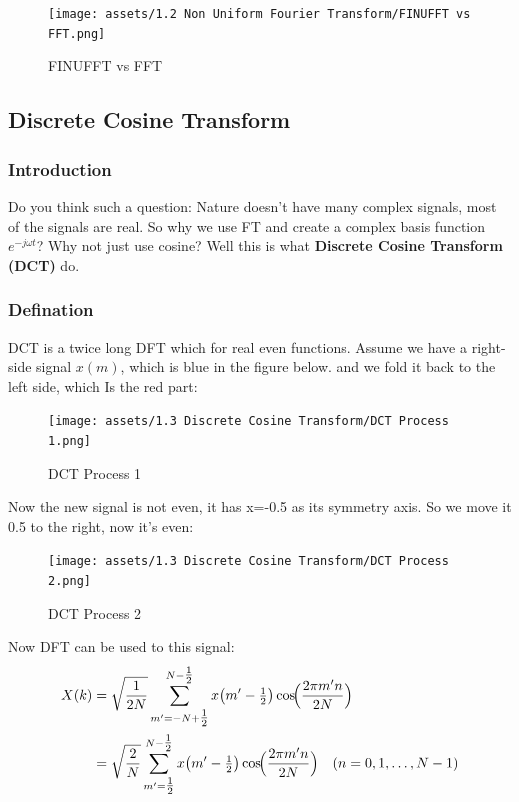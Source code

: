 \documentclass[12pt]{ctexart}
\begin{document}
\begin{figure}[H]
  \centering
  \texttt{[image: assets/1.2 Non Uniform Fourier Transform/FINUFFT
  vs FFT.png]}
  \caption{FINUFFT vs FFT}
\end{figure}

\subsection{\textbf{Discrete Cosine Transform}}

\subsubsection{\textbf{Introduction}}

Do you think such a question: Nature doesn't have many complex signals, most of the signals
are real. So why we use FT and create a complex basis function $e^{-j\omega t}$? Why not
just use cosine? Well this is what \textbf{Discrete Cosine Transform (DCT)} do.

\subsubsection{\textbf{Defination}}

DCT is a twice long DFT which for real even functions. Assume we have a right-side signal
$x(m)$, which is blue in the figure below. and we fold it back to the left side, which Is
the red part:

\begin{figure}[H]
  \centering
  \texttt{[image: assets/1.3 Discrete Cosine Transform/DCT
  Process 1.png]}
  \caption{DCT Process 1}
\end{figure}

Now the new signal is not even, it has x=-0.5 as its symmetry axis. So we move it 0.5 to
the right, now it's even:

\begin{figure}[H]
  \centering
  \texttt{[image: assets/1.3 Discrete Cosine Transform/DCT
  Process 2.png]}
  \caption{DCT Process 2}
\end{figure}

Now DFT can be used to this signal:
\begin{align}
X(k) &= \sqrt{\frac{1}{2N}}\sum_{m'=-N+\tfrac12}^{N-\tfrac12} x\bigl(m'-\tfrac12\bigr)
        \cos\!\Bigl(\frac{2\pi m'n}{2N}\Bigr)\\
     &= \sqrt{\frac{2}{N}}\sum_{m'=\tfrac12}^{N-\tfrac12}x\bigl(m'-\tfrac12\bigr)
        \cos\!\Bigl(\frac{2\pi m'n}{2N}\Bigr)
        \quad(n = 0,1,\dots,N-1)
\end{align}
\end{document}
